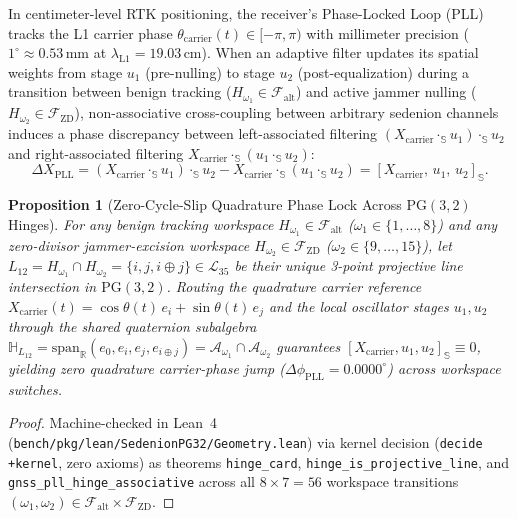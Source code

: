 \documentclass[11pt,a4paper]{article}
\newtheorem{proposition}[theorem]{Proposition}
\theoremstyle{definition}
\theoremstyle{remark}
\newcommand{\R}{\mathbb{R}}
\newcommand{\Ha}{\mathbb{H}}
\newcommand{\Se}{\mathbb{S}}
\newcommand{\PG}{\mathrm{PG}}
\newcommand{\Falt}{\mathcal{F}_{\mathrm{alt}}}
\newcommand{\Fzd}{\mathcal{F}_{\mathrm{ZD}}}
\begin{document}
In centimeter-level RTK positioning, the receiver's Phase-Locked Loop (PLL) tracks the L1 carrier phase $\theta_{\mathrm{carrier}}(t) \in [-\pi, \pi)$ with millimeter precision ($1^\circ \approx 0.53\,\mathrm{mm}$ at $\lambda_{\mathrm{L1}} = 19.03\,\mathrm{cm}$). When an adaptive filter updates its spatial weights from stage $u_1$ (pre-nulling) to stage $u_2$ (post-equalization) during a transition between benign tracking ($H_{\omega_1} \in \Falt$) and active jammer nulling ($H_{\omega_2} \in \Fzd$), non-associative cross-coupling between arbitrary sedenion channels induces a phase discrepancy between left-associated filtering $(X_{\mathrm{carrier}} \cdot_{\Se} u_1) \cdot_{\Se} u_2$ and right-associated filtering $X_{\mathrm{carrier}} \cdot_{\Se} (u_1 \cdot_{\Se} u_2)$:
\begin{equation}
\label{eq:phase_associator}
\Delta X_{\mathrm{PLL}} = (X_{\mathrm{carrier}} \cdot_{\Se} u_1) \cdot_{\Se} u_2 - X_{\mathrm{carrier}} \cdot_{\Se} (u_1 \cdot_{\Se} u_2) = [X_{\mathrm{carrier}}, \, u_1, \, u_2]_{\Se}.
\end{equation}

\begin{proposition}[Zero-Cycle-Slip Quadrature Phase Lock Across $\PG(3,2)$ Hinges]
\label{prop:pll_hinge}
For any benign tracking workspace $H_{\omega_1} \in \Falt$ ($\omega_1 \in \{1, \dots, 8\}$) and any zero-divisor jammer-excision workspace $H_{\omega_2} \in \Fzd$ ($\omega_2 \in \{9, \dots, 15\}$), let $L_{12} = H_{\omega_1} \cap H_{\omega_2} = \{i, j, i \oplus j\} \in \mathcal{L}_{35}$ be their unique 3-point projective line intersection in $\PG(3,2)$. Routing the quadrature carrier reference $X_{\mathrm{carrier}}(t) = \cos\theta(t) \, e_i + \sin\theta(t) \, e_j$ and the local oscillator stages $u_1, u_2$ through the shared quaternion subalgebra $\Ha_{L_{12}} = \mathrm{span}_{\R}(e_0, e_i, e_j, e_{i \oplus j}) = \mathcal{A}_{\omega_1} \cap \mathcal{A}_{\omega_2}$ guarantees $[X_{\mathrm{carrier}}, u_1, u_2]_{\Se} \equiv 0$, yielding zero quadrature carrier-phase jump ($\Delta\phi_{\mathrm{PLL}} = 0.0000^\circ$) across workspace switches.
\end{proposition}
\begin{proof}
Machine-checked in Lean~4 (\texttt{bench/pkg/lean/SedenionPG32/Geometry.lean}) via kernel decision (\texttt{decide +kernel}, zero axioms) as theorems \texttt{hinge\_card}, \texttt{hinge\_is\_projective\_line}, and \texttt{gnss\_pll\_hinge\_associative} across all $8 \times 7 = 56$ workspace transitions $(\omega_1, \omega_2) \in \Falt \times \Fzd$.
\end{proof}
\end{document}
